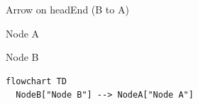 \documentclass[11pt,a4paper]{article}
\begin{document}
Arrow on headEnd (B to A)

Node A

Node B

\begin{figure}[h]
\end{figure}

\begin{verbatim}
flowchart TD
  NodeB["Node B"] --> NodeA["Node A"]
\end{verbatim}
\end{document}
